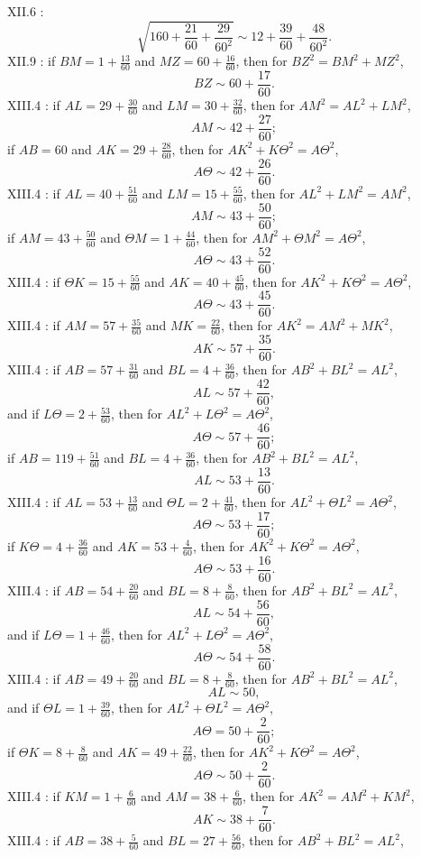 \documentclass{article}
\theoremstyle{definition}
\begin{document}
XII.6 \cite[p.~581]{almagest}:
\[
\sqrt{160+\frac{21}{60}+\frac{29}{60^2}} \sim 12+\frac{39}{60}+\frac{48}{60^2}.
\]
XII.9 \cite[p.~591]{almagest}: if $BM=1+\frac{13}{60}$ and $MZ=60+\frac{16}{60}$, then for $BZ^2=BM^2+MZ^2$,
\[
BZ \sim 60+\frac{17}{60}.
\]
XIII.4 \cite[p.~608]{almagest}: if $AL=29+\frac{30}{60}$ and $LM=30+\frac{32}{60}$, then for $AM^2=AL^2+LM^2$,
\[
AM \sim 42+\frac{27}{60};
\]
if $AB=60$ and $AK=29+\frac{28}{60}$, then for $AK^2+K\Theta^2=A\Theta^2$,
\[
A\Theta \sim 42+\frac{26}{60}.
\]
XIII.4 \cite[p.~610]{almagest}: if $AL=40+\frac{51}{60}$ and $LM=15+\frac{55}{60}$, then for $AL^2+LM^2=AM^2$,
\[
AM \sim 43+\frac{50}{60};
\]
if $AM=43+\frac{50}{60}$ and $\Theta M = 1+\frac{44}{60}$, then for $AM^2+\Theta M^2=A \Theta^2$,
\[
A\Theta \sim 43+\frac{52}{60}.
\]
XIII.4 \cite[p.~611]{almagest}: if $\Theta K = 15+\frac{55}{60}$ and $AK=40+\frac{45}{60}$, then for
$AK^2+K\Theta^2 = A\Theta^2$,
\[
A\Theta \sim 43+\frac{45}{60}.
\]
XIII.4 \cite[p.~613]{almagest}: if $AM=57+\frac{35}{60}$ and $MK=\frac{22}{60}$, then for $AK^2=AM^2+MK^2$,
\[
AK \sim 57+\frac{35}{60}.
\]
XIII.4 \cite[p.~614]{almagest}: if $AB=57+\frac{31}{60}$ and $BL=4+\frac{36}{60}$, then for $AB^2+BL^2=AL^2$,
\[
AL \sim 57+\frac{42}{60},
\]
and if $L\Theta = 2+\frac{53}{60}$, then for $AL^2+L\Theta^2=A\Theta^2$,
\[
A\Theta \sim 57+\frac{46}{60};
\]
if $AB=119+\frac{51}{60}$ and $BL=4+\frac{36}{60}$, then for $AB^2+BL^2=AL^2$,
\[
AL \sim 53+\frac{13}{60}.
\]
XIII.4 \cite[p.~615]{almagest}: if $AL=53+\frac{13}{60}$ and $\Theta L = 2+\frac{41}{60}$, then for $AL^2+\Theta L^2=
A\Theta^2$,
\[
A\Theta \sim 53+\frac{17}{60};
\]
if $K\Theta = 4+\frac{36}{60}$ and $AK=53+\frac{4}{60}$, then for $AK^2+K\Theta^2=A\Theta^2$,
\[
A\Theta \sim 53+\frac{16}{60}.
\]
XIII.4 \cite[p.~617]{almagest}: if $AB=54+\frac{20}{60}$ and $BL=8+\frac{8}{60}$, then for $AB^2+BL^2=AL^2$,
\[
AL \sim 54+\frac{56}{60},
\]
and if $L\Theta = 1+\frac{46}{60}$, then for $AL^2+L\Theta^2=A\Theta^2$,
\[
A\Theta \sim 54+\frac{58}{60}.
\]
XIII.4 \cite[p.~618]{almagest}: if $AB=49+\frac{20}{60}$ and $BL=8+\frac{8}{60}$, then for
$AB^2+BL^2=AL^2$,
\[
AL \sim 50,
\]
and if $\Theta L = 1+\frac{39}{60}$, then for $AL^2+\Theta L^2=A\Theta^2$,
\[
A\Theta = 50+\frac{2}{60};
\]
if $\Theta K = 8+\frac{8}{60}$ and $AK=49+\frac{22}{60}$, then for $AK^2+K\Theta^2=A\Theta^2$,
\[
A\Theta \sim 50+\frac{2}{60}.
\]
XIII.4 \cite[p.~619]{almagest}: if $KM=1+\frac{6}{60}$ and $AM=38+\frac{6}{60}$, then for $AK^2=AM^2+KM^2$,
\[
AK \sim 38+\frac{7}{60}.
\]
XIII.4 \cite[p.~620]{almagest}: if $AB=38+\frac{5}{60}$ and $BL=27+\frac{56}{60}$, then for $AB^2+BL^2=AL^2$,
\end{document}

